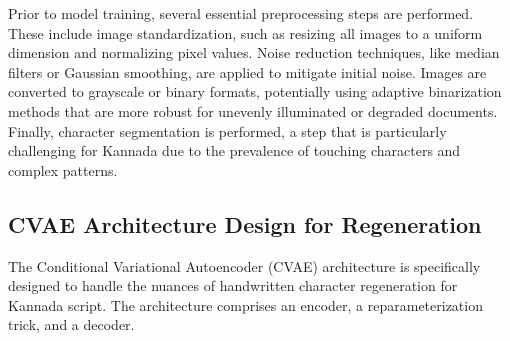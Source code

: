 \documentclass[conference]{IEEEtran}
\begin{document}
Prior to model training, several essential preprocessing steps are performed. These include image standardization, such as resizing all images to a uniform dimension and normalizing pixel values.\cite{Bhunia2023, Hebbi2023} Noise reduction techniques, like median filters or Gaussian smoothing, are applied to mitigate initial noise.\cite{Hebbi2023} Images are converted to grayscale or binary formats, potentially using adaptive binarization methods that are more robust for unevenly illuminated or degraded documents.\cite{Davis2020, Emuru2023, Bhunia2023} Finally, character segmentation is performed, a step that is particularly challenging for Kannada due to the prevalence of touching characters and complex patterns.\cite{Bhunia2023}

\subsection{CVAE Architecture Design for Regeneration}
\justify
The Conditional Variational Autoencoder (CVAE) architecture is specifically designed to handle the nuances of handwritten character regeneration for Kannada script. The architecture comprises an encoder, a reparameterization trick, and a decoder.\cite{Davis2020}
\end{document}
